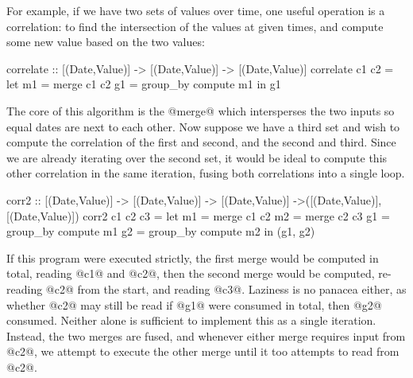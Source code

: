 


For example, if we have two sets of values over time, one useful operation is a correlation: to find the intersection of the values at given times, and compute some new value based on the two values:
\begin{code}
correlate :: [(Date,Value)] -> [(Date,Value)]
          -> [(Date,Value)]
correlate c1 c2
 = let m1 = merge c1 c2
       g1 = group_by compute m1
   in  g1
\end{code}

The core of this algorithm is the @merge@ which intersperses the two inputs so equal dates are next to each other.
Now suppose we have a third set and wish to compute the correlation of the first and second, and the second and third.
Since we are already iterating over the second set, it would be ideal to compute this other correlation in the same iteration, fusing both correlations into a single loop.

\begin{code}
corr2     :: [(Date,Value)] -> [(Date,Value)]
          -> [(Date,Value)]
          ->([(Date,Value)],   [(Date,Value)])
corr2     c1 c2 c3
 = let m1 = merge c1 c2
       m2 = merge c2 c3
       g1 = group_by compute m1
       g2 = group_by compute m2
   in (g1, g2)
\end{code}

If this program were executed strictly, the first merge would be computed in total, reading @c1@ and @c2@, then the second merge would be computed, re-reading @c2@ from the start, and reading @c3@.
Laziness is no panacea either, as whether @c2@ may still be read if @g1@ were consumed in total, then @g2@ consumed.
Neither alone is sufficient to implement this as a single iteration.
Instead, the two merges are fused, and whenever either merge requires input from @c2@, we attempt to execute the other merge until it too attempts to read from @c2@.

